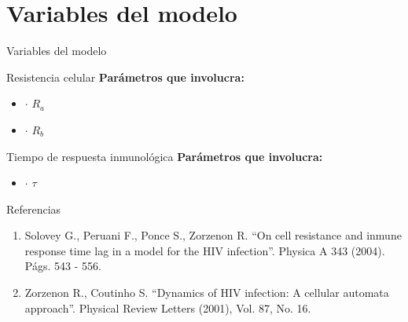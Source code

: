 \documentclass[12pt, compress, titleprogressbar]{beamer}
\begin{document}
	\section{Variables del modelo}
	\begin{frame}{Variables del modelo}
		\begin{block}{Resistencia celular}
			\textbf{Parámetros que involucra:}
			\begin{itemize}
				\item $\cdot$ $R_a$
				\item $\cdot$ $R_b$
			\end{itemize}
		\end{block}

		\begin{block}{Tiempo de respuesta inmunológica}
			\textbf{Parámetros que involucra:}
			\begin{itemize}
				\item $\cdot$ $\tau$
			\end{itemize}
		\end{block}
	\end{frame}


	\begin{frame}{Referencias}
		\begin{enumerate}
			\item Solovey G., Peruani F., Ponce S., Zorzenon R. ``On cell resistance and inmune response time lag in a model for the HIV infection''. Physica A 343 (2004). Págs. 543 - 556.\\
			\item Zorzenon R., Coutinho S. ``Dynamics of HIV infection: A cellular automata approach''. Physical Review Letters (2001), Vol. 87, No. 16.
		\end{enumerate}
	\end{frame}
\end{document}

